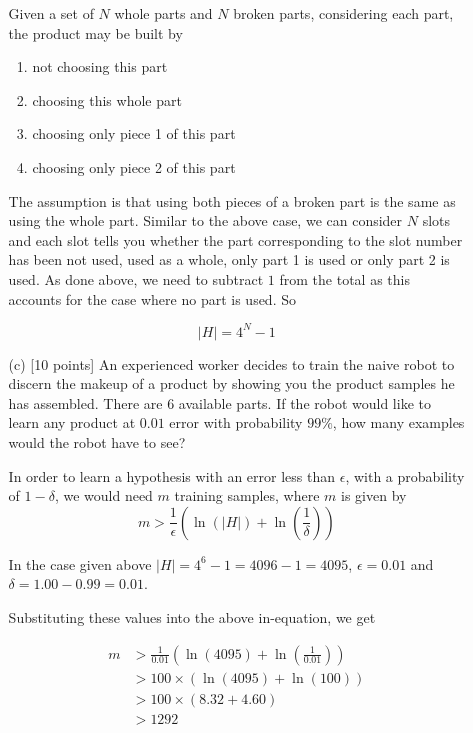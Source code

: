 \begin{enumerate}
\begin{itemize}
Given a set of $N$ whole parts and $N$ broken parts, considering each part, the product may be built by 

\begin{enumerate}

\item not choosing this part
\item choosing this whole part 
\item choosing only piece 1 of this part
\item choosing only piece 2 of this part

\end{enumerate}

The assumption is that using both pieces of a broken part is the same as using the whole part. Similar to the above case, we can consider $N$ slots and each slot tells you whether the part corresponding to the slot number has been not used, used as a whole, only part 1 is used or only part 2 is used. As done above, we need to subtract $1$ from the total as this accounts for the case where no part is used. So

$$
\left | H \right | = 4^N - 1
$$

\item[(c)] [10 points] An experienced worker decides to train the
  naive robot to discern the makeup of a product by showing you the
  product samples he has assembled. There are 6 available parts. If
  the robot would like to learn any product at $0.01$ error with
  probability $99\%$, how many examples would the robot have to see?
  
In order to learn a hypothesis with an error less than $\epsilon$, with a probability of $1-\delta$, we would need $m$ training samples, where $m$ is given by
$$  
m > \frac{1}{\epsilon} \left ( \ln(\left | H \right |) + \ln \left ( \frac{1}{\delta} \right ) \right )
$$

In the case given above $\left | H \right | = 4^6 -1 = 4096-1=4095$, $\epsilon=0.01$ and $\delta=1.00- 0.99=0.01$.

Substituting these values into the above in-equation, we get

\begin{equation*}
\begin{aligned}
m &> \frac{1}{0.01} \left ( \ln(4095) + \ln \left ( \frac{1}{0.01} \right ) \right )\\
&> 100 \times \left ( \ln(4095) + \ln (100) \right )\\
&> 100 \times \left ( 8.32 + 4.60 \right )\\
&>1292
\end{aligned}
\end{equation*}


\end{itemize}
\end{enumerate}
